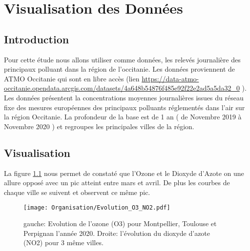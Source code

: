 \documentclass[a4paper,11pt,twoside,openright]{report}
\theoremstyle{plain}
\theoremstyle{definition}
\theoremstyle{remark}
\begin{document}
\tableofcontents
{}
\listoftables
{}
\clearpage


\pagestyle{fancy}


\chapter{Visualisation des Données}

\section{Introduction}
\label{sec:Introduction aux données }
Pour cette étude nous allons utiliser comme données, les relevés journalière des principaux polluant dans la région de l'occitanie. Les données proviennent de ATMO Occitanie qui sont en libre accès
(lien \url{ https://data-atmo-occitanie.opendata.arcgis.com/datasets/4a648b54876f485e92f22e2ad5a5da32_0} ). 
Les données présentent la concentrations moyennes journalières issues du réseau fixe des mesures européennes des principaux polluants réglementés dans l'air sur la région Occitanie. La profondeur de la base est de 1 an ( de Novembre 2019 à Novembre 2020 ) et regroupes les principales villes de la région.


\section{Visualisation}
\label{sec:visualisation}

La figure \ref{fig:Evo} nous permet de constaté que l'Ozone et le Dioxyde d'Azote on une allure opposé avec un pic atteint entre mars et avril. De plus les courbes de chaque ville se suivent et observent ce même pic.
\begin{figure}
  \centering
  \texttt{[image: Organisation/Evolution\_O3\_NO2.pdf]}
  \caption[Titre plus synthétique aller voir comme il diffère du titre
  original.]{gauche: Evolution de l'ozone (O3) pour Montpellier, Toulouse et Perpignan l'année 2020. Droite: l'évolution du dioxyde d'azote (NO2) pour 3 même villes.  }
  \label{fig:Evo}
\end{figure}
\end{document}
